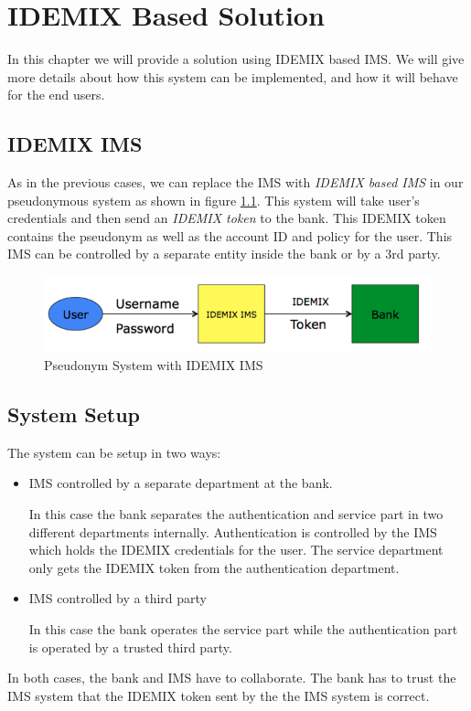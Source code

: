 \chapter{IDEMIX Based Solution}
In this chapter we will provide a solution using IDEMIX based IMS. We will give more details about how this system can be implemented, and how it will behave for the end users.
\section{IDEMIX IMS}
As in the previous cases, we can replace the IMS with \textit{IDEMIX based IMS} in our pseudonymous system as shown in figure \ref{fig:IDEMIX}. This system will take user's credentials and then send an \textit{IDEMIX token} to the bank. This IDEMIX token contains the pseudonym as well as the account ID and policy for the user. This IMS can be controlled by a separate entity inside the bank or by a 3rd party.
\begin{figure}[h]
	\centering
	\includegraphics[width=\textwidth]{figures/IDEMIX}
	\caption{Pseudonym System with IDEMIX IMS}
	\label{fig:IDEMIX}
\end{figure}
\section{System Setup}
The system can be setup in two ways:
\begin{itemize}
	\item IMS controlled by a separate department at the bank.
	
	In this case the bank separates the authentication and service part in two different departments internally. Authentication is controlled by the IMS which holds the IDEMIX credentials for the user. The service department only gets the IDEMIX token from the authentication department.
	\item IMS controlled by a third party
	
	In this case the bank operates the service part while the authentication part is operated by a trusted third party.
\end{itemize}
In both cases, the bank and IMS have to collaborate. The bank has to trust the IMS system that the IDEMIX token sent by the the IMS system is correct.
